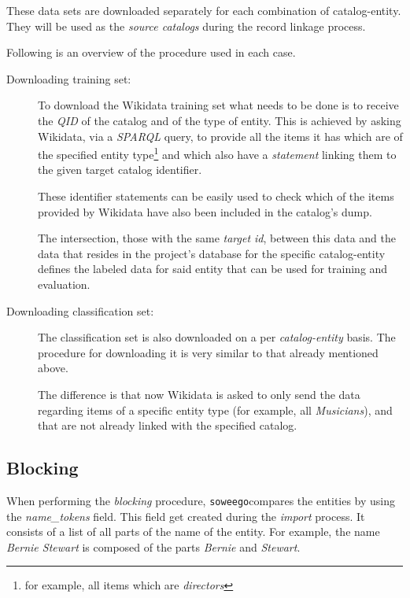 \documentclass[epsfig,a4paper,11pt,titlepage,twoside,openany]{book}
\newcommand{\soweego}[0]{\texttt{soweego}}
\begin{document}
These data sets are downloaded separately for each combination of catalog-entity. They will be used as the \textit{source catalogs} during the record linkage process.

Following is an overview of the procedure used in each case. 

\begin{description}
\item[Downloading training set:] 

To download the Wikidata training set what needs to be done is to receive the \textit{QID} of the catalog and of the type of entity. This is achieved by asking Wikidata, via a \textit{SPARQL} query, to provide all the items it has which are of the specified entity type\footnote{for example, all items which are \textit{directors}} and which also have a \textit{statement} linking them to the given target catalog identifier. 

These identifier statements can be easily used to check which of the items provided by Wikidata have also been included in the catalog's dump. 

The intersection, those with the same \textit{target id}, between this data and the data that resides in the project’s database for the specific catalog-entity defines the labeled data  for said entity that can be used for training and evaluation.
 
 
\item[Downloading classification set:] The classification set is also downloaded on a per \textit{catalog-entity} basis. The procedure for downloading it is very similar to that already mentioned above. 

The difference is that now Wikidata is asked to only send  the data regarding items of a specific entity type (for example, all \textit{Musicians}), and that are not already linked with the specified catalog.
\end{description}



\subsection{Blocking}
\label{sec:soweego-st-blocking}

When performing the \textit{blocking} procedure, \soweego compares the entities by using the \textit{name\_tokens} field. This field get created during the \textit{import} process. It consists of a list of all parts of the name of the entity. For example, the name \textit{Bernie Stewart} is composed of the parts \textit{Bernie} and \textit{Stewart}.
\end{document}
